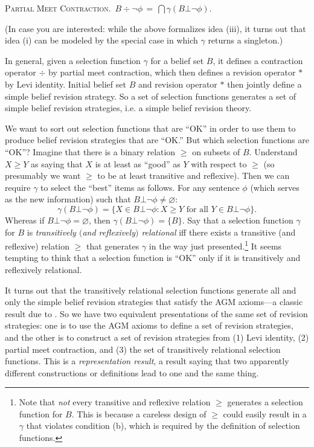 \xm \textsc{Partial Meet Contraction.}\, $B \div \neg \phi \,=\, \bigcap\gamma(B\bot\neg\phi)$.

\ed (In case you are interested: while the above formalizes idea (iii), it turns out that idea (i) can be modeled by the special case in which $\gamma$ returns a singleton.)

In general, given a selection function $\gamma$ for a belief set $B$, it defines a contraction operator $\div$ by partial meet contraction, which then defines a revision operator $*$ by Levi identity. Initial belief set $B$ and revision operator $*$ then jointly define a simple belief revision strategy. So a set of selection functions generates a set of simple belief revision strategies, i.e. a simple belief revision theory.

We want to sort out selection functions that are  ``OK'' in order to use them to produce belief revision strategies that are ``OK.'' But which selection functions are ``OK''? Imagine that there is a binary relation $\ge$ on subsets of $B$. Understand $X \ge Y$ as saying that $X$ is at least as ``good'' as $Y$ with respect to $\ge$ (so presumably we want $\ge$ to be at least transitive and reflexive). Then we can require $\gamma$ to select the ``best'' items as follows. For any sentence $\phi$ (which serves as the new information) such that $B\bot\neg\phi \neq \varnothing$:
$$ \gamma(B\bot\neg\phi) = \{X \in B\bot\neg\phi : X \ge Y \mbox{ for all } Y \in B\bot\neg\phi \}.$$
Whereas if $B\bot\neg\phi = \varnothing$, then $\gamma(B\bot\neg\phi) = \{B\}$. Say that a selection function $\gamma$ for $B$ is {\em transitively $($and reflexively$)$ relational} iff there exists a transitive (and reflexive) relation $\ge$ that generates $\gamma$ in the way just presented.\footnote
	{Note that {\em not} every transitive and reflexive relation $\ge$ generates a selection function for $B$. This is because a careless design of $\ge$ could easily result in a $\gamma$ that violates condition (b), which is required by the definition of selection functions.}
It seems tempting to think that a selection function is ``OK'' only if it is transitively and reflexively relational.

It turns out that the transitively relational selection functions generate all and only the simple belief revision strategies that satisfy the AGM axioms---a classic result due to \citet*{alchourron1985logic}. So we have two equivalent presentations of the same set of revision strategies: one is to use the AGM axioms to define a set of revision strategies, and the other is to construct a set of revision strategies from (1) Levi identity, (2) partial meet contraction, and (3) the set of transitively relational selection functions. This is a {\em representation result}, a result saying that two apparently different constructions or definitions lead to one and the same thing. 

